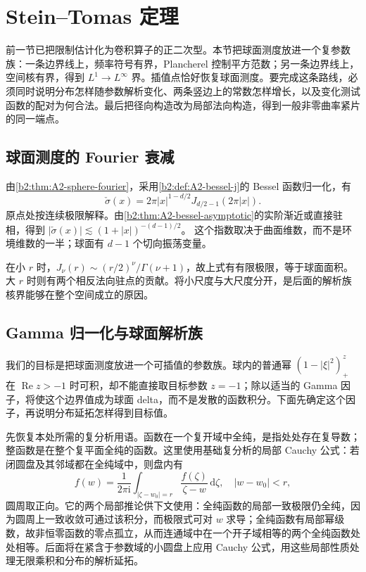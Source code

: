 \section{Stein–Tomas 定理}
\label{b2:sec:2304}

前一节已把限制估计化为卷积算子的正二次型。本节把球面测度放进一个复参数族：一条边界线上，频率符号有界，Plancherel 控制平方范数；另一条边界线上，空间核有界，得到 \(L^1\to L^\infty\) 界。插值点恰好恢复球面测度。要完成这条路线，必须同时说明分布怎样随参数解析变化、两条竖边上的常数怎样增长，以及变化测试函数的配对为何合法。最后把径向构造改为局部法向构造，得到一般非零曲率紧片的同一端点。

\subsection{球面测度的 Fourier 衰减}
\label{b2:subsec:230401}

由\cref{b2:thm:A2-sphere-fourier}，采用\cref{b2:def:A2-bessel-j}的 Bessel 函数归一化，有
\[
 \check\sigma(x)=2\pi |x|^{1-d/2}J_{d/2-1}(2\pi|x|).
\]
原点处按连续极限解释。由\cref{b2:thm:A2-bessel-asymptotic}的实阶渐近或直接驻相，得到
\(|\check\sigma(x)|\lesssim(1+|x|)^{-(d-1)/2}\)。
这个指数取决于曲面维数，而不是环境维数的一半；球面有 \(d-1\) 个切向振荡变量。

\ProseParagraphBreak
在小 \(r\) 时，\(J_\nu(r)\sim(r/2)^\nu/\Gamma(\nu+1)\)，故上式有有限极限，等于球面面积。大 \(r\) 时则有两个相反法向驻点的贡献。将小尺度与大尺度分开，是后面的解析族核界能够在整个空间成立的原因。

\subsection{Gamma 归一化与球面解析族}
\label{b2:subsec:230402}

我们的目标是把球面测度放进一个可插值的参数族。球内的普通幂 \((1-|\xi|^2)_+^z\) 在 \(\operatorname{Re}z>-1\) 时可积，却不能直接取目标参数 \(z=-1\)；除以适当的 Gamma 因子，将使这个边界值成为球面 delta，而不是发散的函数积分。下面先确定这个因子，再说明分布延拓怎样得到目标值。

\ProseParagraphBreak
先恢复本处所需的复分析用语。函数在一个复开域中全纯，是指处处存在复导数；整函数是在整个复平面全纯的函数。这里使用基础复分析的局部 Cauchy 公式：若闭圆盘及其邻域都在全纯域中，则盘内有
\[
 f(w)=\frac1{2\pi\mathrm i}\int_{|\zeta-w_0|=r}
          \frac{f(\zeta)}{\zeta-w}\,\mathrm d\zeta,
 \quad |w-w_0|<r,
\]
圆周取正向。它的两个局部推论供下文使用：全纯函数的局部一致极限仍全纯，因为圆周上一致收敛可通过该积分，而极限式可对 \(w\) 求导；全纯函数有局部幂级数，故非恒零函数的零点孤立，从而连通域中在一个开子域相等的两个全纯函数处处相等。后面将在紧含于参数域的小圆盘上应用 Cauchy 公式，用这些局部性质处理无限乘积和分布的解析延拓。

